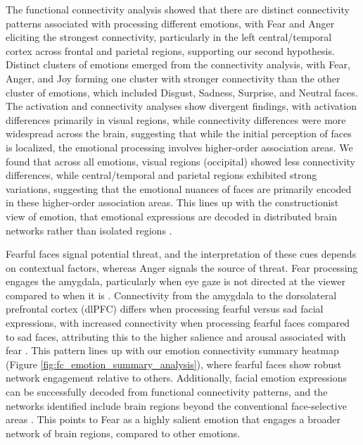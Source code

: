 The functional connectivity analysis showed that there are distinct connectivity patterns associated with processing different emotions, with Fear and Anger eliciting the strongest connectivity, particularly in the left central/temporal cortex across frontal and parietal regions, supporting our second hypothesis.
Distinct clusters of emotions emerged from the connectivity analysis, with Fear, Anger, and Joy forming one cluster with stronger connectivity than the other cluster of emotions, which included Disgust, Sadness, Surprise, and Neutral faces.
The activation and connectivity analyses show divergent findings, with activation differences primarily in visual regions, while connectivity differences were more widespread across the brain, suggesting that while the initial perception of faces is localized, the emotional processing involves higher-order association areas. 
We found that across all emotions, visual regions (occipital) showed less connectivity differences, while central/temporal and parietal regions exhibited strong variations, suggesting that the emotional nuances of faces are primarily encoded in these higher-order association areas. 
This lines up with the constructionist view of emotion, that emotional expressions are decoded in distributed brain networks rather than isolated regions \citep{barrett_solving_2006}. 

Fearful faces signal potential threat, and the interpretation of these cues depends on contextual factors, whereas Anger signals the source of threat. 
Fear processing engages the amygdala, particularly when eye gaze is not directed at the viewer compared to when it is \citep{cushing_neurodynamics_2018}.
Connectivity from the amygdala to the dorsolateral prefrontal cortex (dlPFC) differs when processing fearful versus sad facial expressions, with increased connectivity when processing fearful faces compared to sad faces, attributing this to the higher salience and arousal associated with fear \citep{jamieson_differential_2021, adolphs_biology_2013}.
This pattern lines up with our emotion connectivity summary heatmap (Figure \ref{fig:fc_emotion_summary_analysis}), where fearful faces show robust network engagement relative to others. 
Additionally, facial emotion expressions can be successfully decoded from functional connectivity patterns, and the networks identified include brain regions beyond the conventional face-selective areas \citep{liang_multivariate_2018}. 
This points to Fear as a highly salient emotion that engages a broader network of brain regions, compared to other emotions. 

